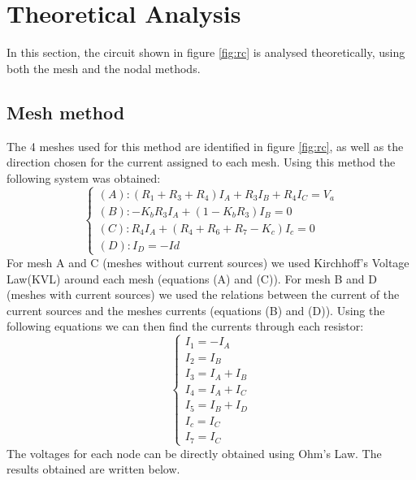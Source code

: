 \newpage
\section{Theoretical Analysis}
\label{sec:analysis}

In this section, the circuit shown in figure \ref{fig:rc} is analysed
theoretically, using both the mesh and the nodal methods.

\subsection{Mesh method}
The 4 meshes used for this method are identified in figure \ref{fig:rc}, as well as the direction chosen for the current assigned to each mesh.
Using this method the following system was obtained:
\begin{equation}
  \begin{cases}
    \left(A\right): \left(R_{1}+R_{3}+R_{4}\right)I_{A}+R_{3}I_{B}+R_{4}I_{C}=V_{a} \\
    \left(B\right): -K_{b}R_{3}I_{A}+\left(1-K_{b}R_{3}\right)I_{B}=0               \\
    \left(C\right): R_{4}I_{A}+\left(R_{4}+R_{6}+R_{7}-K_{c}\right)I_{c}=0        \\
    \left(D\right): I_{D}=-Id
  \end{cases}
\end{equation}
For mesh A and C (meshes without current sources) we used Kirchhoff's Voltage Law(KVL) around each mesh (equations (A) and (C)).
For mesh B and D (meshes with current sources) we used the relations between the current of the current sources and the meshes currents (equations (B) and (D)).
Using the following equations we can then find the currents through each resistor:
\begin{equation}
  \begin{cases}
    I_{1}=-I_{A}      \\
    I_{2}=I_{B}       \\
    I_{3}=I_{A}+I_{B} \\
    I_{4}=I_{A}+I_{C} \\
    I_{5}=I_{B}+I_{D} \\
    I_{c}=I_{C}       \\
    I_{7}=I_{C}
  \end{cases}
\end{equation}
The voltages for each node can be directly obtained using Ohm's Law.
The results obtained are written below.

